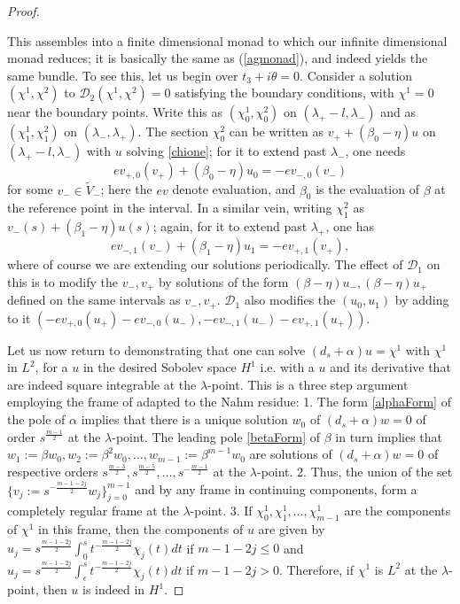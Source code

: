 \documentclass[12pt]{article}
\theoremstyle{definition}
\theoremstyle{remark}
\numberwithin{theorem}{section}
\newcommand{\cD}{\mathcal{D}}
\begin{document}
\begin{proof}
\begin{itemize}
\end{itemize}
 
This assembles into a finite dimensional monad to which our infinite dimensional monad reduces; it is basically the same as (\ref{agmonad}), and indeed yields the same bundle. To see this, let us begin over $t_3+i\theta = 0$. Consider a solution   $(\chi^1, \chi^2)$ to $\cD_2(\chi^1, \chi^2) =0$ satisfying the boundary conditions, with $\chi^1 = 0$ near the boundary points. Write this as  $(\chi^1_0, \chi^2_0)$ on $(\lambda_+-l, \lambda_-)$ and as $(\chi^1_1, \chi^2_1)$ on $(\lambda_-, \lambda_+)$. The section  $  \chi^2_0 $  can be written as 
 $v_+ +(\beta_0-\eta) u $  on $(\lambda_+-l, \lambda_-)$ with $u$ solving \eqref{chione}; for it to extend past $\lambda_-$, one needs
 $$ev_{+,0} (v_+) + (\beta_0-\eta) u_0 = -ev_{-,0}(v_-)$$
 for some $v_-\in \widetilde V_-$; here the $ev$ denote evaluation, and $\beta_0$ is the evaluation of $\beta$ at the reference point in the interval.  In a similar vein, writing $\chi^2_1 $ as $v_-(s) +(\beta_1-\eta)u(s)$; again, for it to extend past $\lambda_+$, one has
 $$ev_{-,1}(v_-) + (\beta_1-\eta)u_1 =  -ev_{+,1}(v_+),$$
where of course we are extending our solutions periodically.  The effect of $\cD_1$ on this is to modify the $v_-, v_+$ by solutions of the form $(\beta-\eta)u_-, (\beta-\eta) u_+$ defined on the same intervals as $v_-, v_+$. $\cD_1$ also modifies the $(u_0, u_1)$ by 
adding to it $(-ev_{+,0}(u_+) - ev_{-,0}(u_-), -ev_{-,1}(u_-)- ev_{+,1}(u_+))$. 

Let us now return to 	demonstrating that one can solve  $(d_s+\alpha)u=\chi^1$ with $\chi^1$ in $L^2$, for a $u$   in the desired Sobolev space $H^1$ i.e. with a  $u$ and its derivative that are indeed square integrable at the $\lambda$-point. 
This is a three step argument employing the frame of \cite{Donaldson:1985id} adapted to the Nahm residue: 
1. The form \eqref{alphaForm} of the pole of $\alpha$ implies that there is a unique solution $w_0$  of $(d_s+\alpha)w=0$ of order $s^{\frac{m-1}{2}}$ at the $\lambda$-point.  The leading pole \eqref{betaForm} of $\beta$ in turn implies that $w_1:=\beta w_0, w_2:=\beta^2 w_0, \ldots, w_{m-1}:=\beta^{m-1}w_0$ are solutions of $(d_s+\alpha)w=0$ of respective orders $s^{\frac{m-3}{2}}, s^{\frac{m-5}{2}},\ldots,s^{-\frac{m-1}{2}}$ at the $\lambda$-point. 
2. Thus, the union of the set $\{v_j:=s^{-\frac{m-1-2j}{2}}w_j\}_{j=0}^{m-1}$  and by any frame in continuing components, form a completely regular frame at the $\lambda$-point.  
3. If $\chi^1_0, \chi^1_1, \ldots, \chi^1_{m-1}$ are the components of $\chi^1$ in this frame, then the components of $u$ are given by 
$u_j=s^{\frac{m-1-2j}{2}}\int_0^s t^{-\frac{m-1-2j}{2}} \chi_j(t)dt$ if $m-1-2j\leq0$ and
$u_j=s^{\frac{m-1-2j}{2}}\int_\epsilon^s t^{-\frac{m-1-2j}{2}} \chi_j(t)dt$ if $m-1-2j>0.$ Therefore, if $\chi^1$ is $L^2$ at the $\lambda$-point, then $u$ is indeed in $H^1.$


\end{proof}
\end{document}
